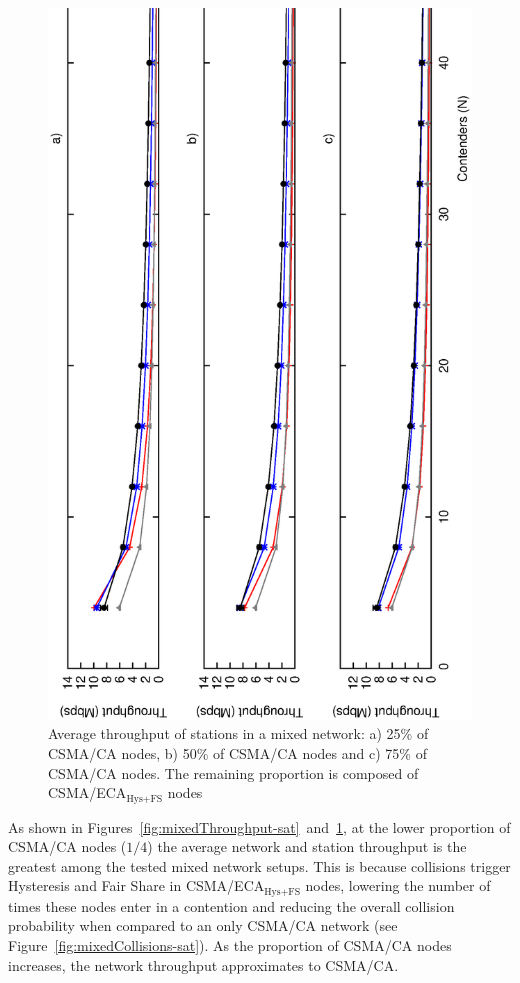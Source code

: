 \documentclass[a4paper,journal]{IEEEtran}
\begin{document}
	\begin{figure}[tb]
		\centering
		\includegraphics[width=0.9\linewidth,angle=-90]{figures/saturated/mixed/throughput-saturated-mixed-stationGroups.eps}
		\caption{Average throughput of stations in a mixed network: a) 25\% of CSMA/CA nodes, b) 50\% of CSMA/CA nodes and c) 75\% of CSMA/CA nodes. The remaining proportion is composed of CSMA/ECA$_{\text{Hys+FS}}$ nodes}
		\label{fig:mixedThroughput-sat-stations}
	\end{figure}
	
	As shown in Figures~\ref{fig:mixedThroughput-sat}~and~\ref{fig:mixedThroughput-sat-stations}, at the lower proportion of CSMA/CA nodes ($1/4$) the average network and station throughput is the greatest among the tested mixed network setups. This is because collisions trigger Hysteresis and Fair Share in CSMA/ECA$_{\text{Hys+FS}}$ nodes, lowering the number of times these nodes enter in a contention and reducing the overall collision probability when compared to an only CSMA/CA network (see Figure~\ref{fig:mixedCollisions-sat}). As the proportion of CSMA/CA nodes increases, the network throughput approximates to CSMA/CA.	
\end{document}
